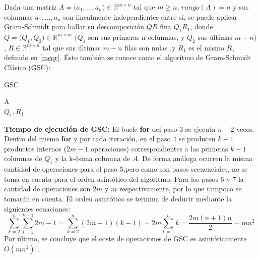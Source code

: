 \documentclass{endm}
\begin{document}
Dada una matriz $A = \big(a_1 , \dots , a_n \big) \in \mathbb{R}^{m \times n}$ tal que $m \geq n$,
$rango(A) = n$ y sus columnas $a_1, \dots , a_n$ son linealmente independientes entre s\'i, se puede
aplicar Gram-Schmidt para hallar su descomposici\'on $QR$ fina $Q_1 R_1$, donde $Q = \big(Q_1,Q_2 \big) \in \mathbb{R}^{m \times m}$ ($Q_1$ son sus primeras n columnas, y $Q_2$ sus \'ultimas $m - n$) ,
$R \in \mathbb{R}^{m \times n}$ tal que sus \'ultimas $m-n$ filas son nulas ,y $R_1$ es el mismo $R_1$ definido en \ref{mcqr}. \'Esto tambi\'en se conoce como el algoritmo de Gram-Schmidt Cl\'asico (GSC):
\begin{algorithm}[H] 
\caption{GSC}\label{cgsalg}
\small
\centering
\begin{algorithmic}[1]
\Require A 
    \EndFor\\
    \Return $Q_1,R_1$ 
\end{algorithmic}
\end{algorithm}

\textbf{Tiempo de ejecuci\'on de GSC:} El bucle \textbf{for} del paso 3 se ejecuta $n-2$ veces.
Dentro del mismo \textbf{for} y por cada iteraci\'on, en el paso 4 se producen $k-1$ productos internos ($2m-1$ operaciones) correspondientes a las primeras $k-1$ columnas de $Q_1$ y la k-\'esima columna de $A$. De forma an\'aloga ocurren la misma cantidad de operaciones para el paso 5,pero como son pasos secuenciales, no se toma en cuenta para el orden asint\'otico del algoritmo. Para los pasos 6 y 7 la cantidad de operaciones son $2m$ y $m$ respectivamente, por lo que tampoco se tomar\'an en cuenta.
El orden asint\'otico se termina de deducir mediante la siguientes ecuaciones:\\
\begin{equation*}
    \sum^{n}_{k=2} \sum^{k-1}_{i=1} 2m-1 = \sum^{n}_{k=2}(2m-1)(k-1) \sim 2m\sum^{n}_{k=1}k = \frac{2m(n+1)n}{2} \sim mn^2
\end{equation*}
Por \'ultimo, se concluye que el coste de operaciones de GSC es asint\'oticamente $O(mn^2)$ .\\
\end{document}
